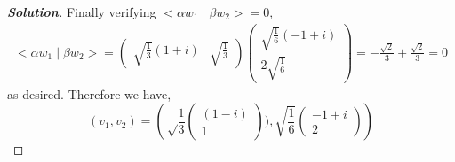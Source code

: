 \documentclass[11pt]{article}
\newenvironment{solution}{\begin{proof}[\textbf{\textit{Solution}}] }{\end{proof}}
\newcommand{\lrp}[1]{\left(#1\right)}
\begin{document}
\begin{solution}
            Finally verifying $<\alpha w_1 \mid \beta w_2> = 0$,
            \begin{align*}
                <\alpha w_1 \mid \beta w_2> = \begin{pmatrix}
                    \sqrt{\frac{1}{3}}(1+i) & \sqrt{\frac{1}{3}}
                \end{pmatrix}\begin{pmatrix}
                    \sqrt{\frac{1}{6}}(-1 + i) \\ 2\sqrt{\frac{1}{6}} 
                \end{pmatrix} = -\frac{\sqrt{2}}{3} + \frac{\sqrt{2}}{3} = 0
            \end{align*}
            as desired. Therefore we have,
            \[(v_1, v_2) = \lrp{\sqrt\frac{1}{3}\begin{pmatrix}
                (1-i) \\ 1
            \end{pmatrix}), \sqrt{\frac{1}{6}}\begin{pmatrix}-1 + i \\ 2 \end{pmatrix}}\]

        \end{solution}
\end{document}
